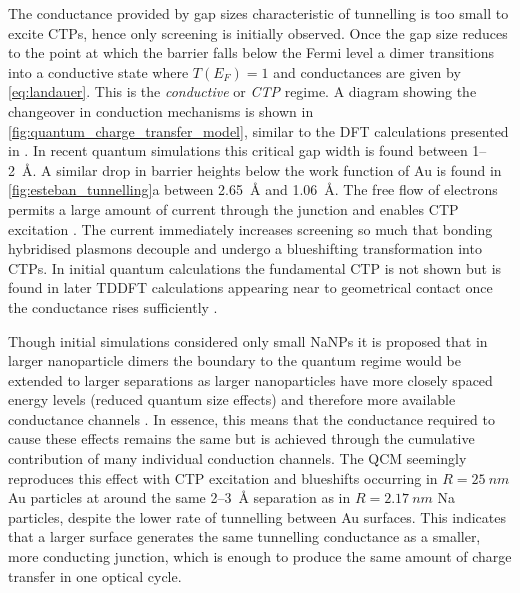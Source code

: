 \documentclass{article}
\begin{document}
The conductance provided by gap sizes characteristic of tunnelling is too small to excite CTPs, hence only screening is initially observed. Once the gap size reduces to the point at which the barrier falls below the Fermi level a dimer transitions into a conductive state where $T(E_F)=1$ and conductances are given by \eqref{eq:landauer}. This is the \emph{conductive} or \emph{CTP} regime. A diagram showing the changeover in conduction mechanisms is shown in \autoref{fig:quantum_charge_transfer_model}, similar to the DFT calculations presented in \cite{zuloaga2009}. In recent quantum simulations this critical gap width is found between 1--\SI{2}{\angstrom}. A similar drop in barrier heights below the work function of Au is found in \autoref{fig:esteban_tunnelling}a between \SI{2.65}{\angstrom} and \SI{1.06}{\angstrom}. The free flow of electrons permits a large amount of current through the junction and enables CTP excitation \cite{zuloaga2009}. The current immediately increases screening so much that bonding hybridised plasmons decouple and undergo a blueshifting transformation into CTPs. In initial quantum calculations \cite{zuloaga2009} the fundamental CTP is not shown but is found in later TDDFT calculations appearing near to geometrical contact once the conductance rises sufficiently \cite{esteban2012, scholl2013}.

Though initial simulations considered only small NaNPs it is proposed that in larger nanoparticle dimers the boundary to the quantum regime would be extended to larger separations as larger nanoparticles have more closely spaced energy levels (reduced quantum size effects) and therefore more available conductance channels \cite{zuloaga2009}. In essence, this means that the conductance required to cause these effects remains the same but is achieved through the cumulative contribution of many individual conduction channels. The QCM seemingly reproduces this effect with CTP excitation and blueshifts occurring in $R=\SI{25}{nm}$ Au particles at around the same 2--\SI{3}{\angstrom} separation as in $R=\SI{2.17}{nm}$ Na particles, despite the lower rate of tunnelling between Au surfaces. This indicates that a larger surface generates the same tunnelling conductance as a smaller, more conducting junction, which is enough to produce the same amount of charge transfer in one optical cycle.
\end{document}
